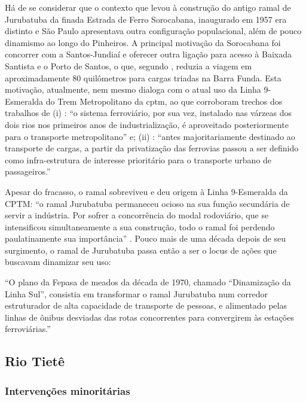 \documentclass[
article,			%
11pt,				%
oneside,			%
a4paper,			%
english,			%
brazil,				%
sumario=tradicional
]{abntex2}
\begin{document}
	Há de se considerar que o contexto que levou à construção do antigo ramal de Jurubatuba da finada Estrada de Ferro Sorocabana, inaugurado em 1957 \cite[p.140]{requena2016a} era distinto e São Paulo apresentava outra configuração populacional, além de pouco dinamismo ao longo do Pinheiros. A principal motivação da Sorocabana foi concorrer com a Santos-Jundiaí e oferecer outra ligação para acesso à Baixada Santista e o Porto de Santos, o que, segundo , reduzia a viagem em aproximadamente 80 quilômetros para cargas triadas na Barra Funda. Esta motivação, atualmente, nem mesmo dialoga com o atual uso da Linha 9-Esmeralda do Trem Metropolitano da \gls{cptm}, ao que corroboram trechos dos trabalhos de (i) : ``o sistema ferroviário, por sua vez, instalado nas várzeas dos dois rios nos primeiros anos de industrialização, é aproveitado posteriormente para o transporte metropolitano'' e; (ii) : ``antes majoritariamente destinado ao transporte de cargas, a partir da privatização das ferrovias passou a ser definido como infra-estrutura de interesse prioritário para o transporte urbano de passageiros.'' 
	
	Apesar do fracasso, o ramal sobreviveu e deu origem à Linha 9-Esmeralda da CPTM: ``o ramal Jurubatuba permaneceu ocioso na sua função secundária de servir a indústria. Por sofrer a concorrência do modal rodoviário, que se intensificou simultaneamente a sua construção, todo o ramal foi perdendo paulatinamente sua importância'' \cite[p.141]{requena2016a}. Pouco mais de uma década depois de seu surgimento, o ramal de Jurubatuba passa então a ser o locus de ações que buscavam dinamizar seu uso:
	
	\begin{citacao}
		``O plano da Fepasa de meados da década de 1970, chamado ``Dinamização da Linha Sul'', consistia em transformar o ramal Jurubatuba num corredor estruturador de alta capacidade de transporte de pessoas, e alimentado pelas linhas de ônibus desviadas das rotas concorrentes para convergirem às estações ferroviárias.'' \cite[p.143]{requena2016a}
	\end{citacao}
	
	\subsection{Rio Tietê} \label{s2:riotiete}
	
	\subsubsection{Intervenções minoritárias} \label{s3:minoritariastiete}
	
\end{document}
